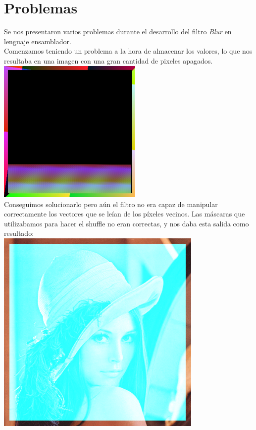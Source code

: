 \documentclass[10pt,a4paper,spanish]{article}
\begin{document}
\section{Problemas}

Se nos presentaron varios problemas durante el desarrollo del filtro \textit{Blur} en lenguaje ensamblador. \\

Comenzamos teniendo un problema a la hora de almacenar los valores, lo que nos resultaba en una imagen con una gran cantidad de pixeles apagados. \\

\includegraphics[width=7cm, keepaspectratio]{problema_colores.jpg} \\

Conseguimos solucionarlo pero aún el filtro no era capaz de manipular correctamente los vectores que se leían de los píxeles vecinos. Las máscaras que utilizabamos para hacer el shuffle no eran correctas, y nos daba esta salida como resultado: \\

\includegraphics[width=10cm, keepaspectratio]{problema_lena_cristal.png} \\
\end{document}
